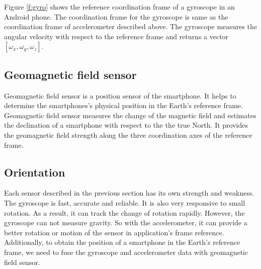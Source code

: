 Figure \ref{f:gyro} shows the reference coordination frame of a gyroscope in an Android phone.
The coordination frame for the gyroscope is same as the coordination frame of accelerometer described above.
The gyroscope measures the angular velocity with respect to the reference frame and returns a vector $[\omega_x, \omega_y, \omega_z]$.


\subsection{Geomagnetic field sensor}
Geomagnetic field sensor is a position sensor of the smartphone.
It helps to determine the smartphones's physical position in the Earth's reference frame.
Geomagnetic field sensor measures the change of the magnetic field and estimates the declination of a smartphone with respect to the the true North. 
It provides the geomagnetic field strength along the three coordination axes of the reference frame.

\subsection{Orientation}
Each sensor described in the previous section has its own strength and weakness.
The gyroscope is fast, accurate and reliable.
It is also very responsive to small rotation.
As a result, it can track the change of rotation rapidly.
However, the gyroscope can not measure gravity. 
So with the accelerometer, it can provide a better rotation or motion of the sensor in application's frame reference. 
Additionally, to obtain the position of a smartphone in the Earth's reference frame, we need to fuse the gyroscope and accelerometer data with geomagnetic field sensor.

